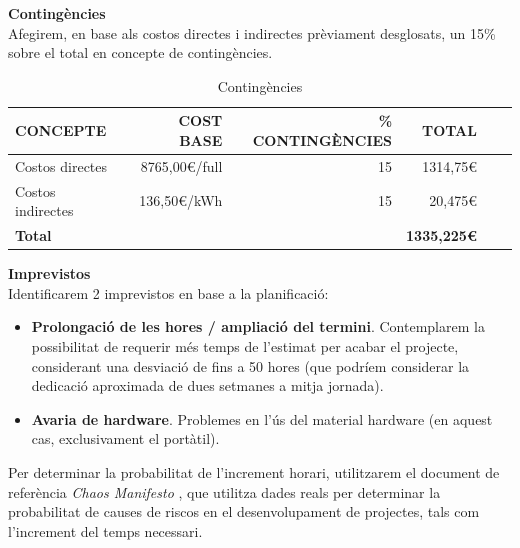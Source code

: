 \noindent \textbf{\large Contingències}\\

\noindent Afegirem, en base als costos directes i indirectes prèviament desglosats, un 15\% sobre el total en concepte de contingències.

\begin{table}[htb]
\centering
\label{PressupostContingencies}
\begin{tabular}{lrrrrr}
\hline \textbf{CONCEPTE}                           & {\color[HTML]{000000} \textbf{COST BASE}} & {\color[HTML]{000000} \textbf{\% CONTINGÈNCIES}} & {\color[HTML]{000000} \textbf{TOTAL}}\\ 
\hline
Costos directes                             & 8765,00\euro /full                                           & 15                                             & 1314,75\euro\\
Costos indirectes                                 & 136,50\euro /kWh                                           & 15                                           & 20,475\euro\\
\hline
\textbf{Total}                               &                              &                                & \textbf{1335,225\euro}       \\
\hline                      
\end{tabular}%
\caption{Contingències}
\end{table}

\noindent \textbf{\large Imprevistos}\\

\noindent Identificarem 2 imprevistos en base a la planificació:

\begin{itemize}
\item \textbf{Prolongació de les hores / ampliació del termini}. Contemplarem la possibilitat de requerir més temps de l’estimat per acabar el projecte, considerant una desviació de fins a 50 hores (que podríem considerar la dedicació aproximada de dues setmanes a mitja jornada).
\item \textbf{Avaria de hardware}. Problemes en l’ús del material hardware (en aquest cas, exclusivament el portàtil).
\end{itemize}

Per determinar la probabilitat de l'increment horari, utilitzarem el document de referència \textit{Chaos Manifesto} \cite{chaos}, que utilitza dades reals per determinar la probabilitat de causes de riscos en el desenvolupament de projectes, tals com l'increment del temps necessari.\\

